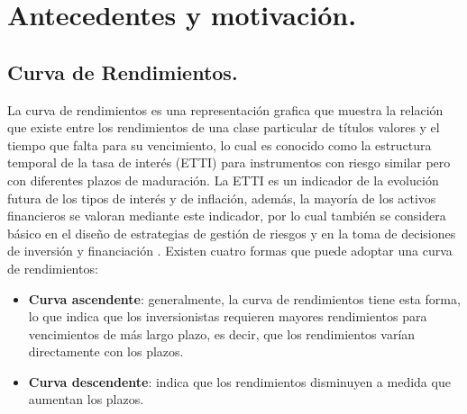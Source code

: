 \chapter{Antecedentes y motivaci\'on.}

\section{Curva de Rendimientos.}



\hspace*{0.4 cm} La curva de rendimientos es una representaci\'on grafica que muestra la relaci\'on que existe entre los rendimientos de una clase particular de t\'itulos valores y el tiempo que falta para su vencimiento, lo cual es conocido como la estructura temporal de la tasa de inter\'es (ETTI) para instrumentos con riesgo similar pero con diferentes plazos de maduraci\'on. La ETTI es un indicador de la evoluci\'on futura de los tipos de inter\'es y de inflaci\'on, adem\'as, la mayor\'ia de los activos financieros se valoran mediante este indicador, por lo cual tambi\'en se considera b\'asico en el dise\~no de estrategias de gesti\'on de riesgos y en la toma de decisiones de inversi\'on y financiaci\'on \cite{FR}. Existen cuatro formas que puede adoptar una curva de rendimientos:

\begin{itemize}
  \item \textbf{Curva ascendente}: generalmente, la curva de rendimientos tiene esta      forma, lo que indica que los inversionistas requieren mayores rendimientos     para vencimientos de m\'as largo plazo, es decir, que los rendimientos         var\'ian directamente con los plazos. 
  \item \textbf{Curva descendente}: indica que los rendimientos disminuyen a medida que   aumentan los plazos.
\end{itemize}

